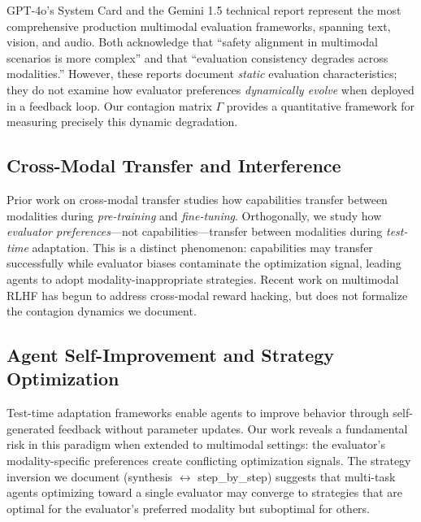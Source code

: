 \documentclass[11pt,a4paper]{article}
\begin{document}
GPT-4o's System Card \cite{openai2024gpt4o} and the Gemini 1.5 technical report \cite{gemini2024gemini15} represent the most comprehensive production multimodal evaluation frameworks, spanning text, vision, and audio. Both acknowledge that ``safety alignment in multimodal scenarios is more complex'' and that ``evaluation consistency degrades across modalities.'' However, these reports document \textit{static} evaluation characteristics; they do not examine how evaluator preferences \textit{dynamically evolve} when deployed in a feedback loop. Our contagion matrix $\Gamma$ provides a quantitative framework for measuring precisely this dynamic degradation.

\subsection{Cross-Modal Transfer and Interference}

Prior work on cross-modal transfer \cite{lu2022multimodal, aghajanyan2021cm3, alayrac2022flamingo} studies how capabilities transfer between modalities during \textit{pre-training} and \textit{fine-tuning}. Orthogonally, we study how \textit{evaluator preferences}---not capabilities---transfer between modalities during \textit{test-time} adaptation. This is a distinct phenomenon: capabilities may transfer successfully while evaluator biases contaminate the optimization signal, leading agents to adopt modality-inappropriate strategies. Recent work on multimodal RLHF \cite{yu2024mmrlhf, sun2024aligning} has begun to address cross-modal reward hacking, but does not formalize the contagion dynamics we document.

\subsection{Agent Self-Improvement and Strategy Optimization}

Test-time adaptation frameworks \cite{shinn2023reflexion, madaan2023selfrefine, yao2023react, wang2024voyager} enable agents to improve behavior through self-generated feedback without parameter updates. Our work reveals a fundamental risk in this paradigm when extended to multimodal settings: the evaluator's modality-specific preferences create conflicting optimization signals. The strategy inversion we document (synthesis $\leftrightarrow$ step\_by\_step) suggests that multi-task agents optimizing toward a single evaluator may converge to strategies that are optimal for the evaluator's preferred modality but suboptimal for others.
\end{document}
